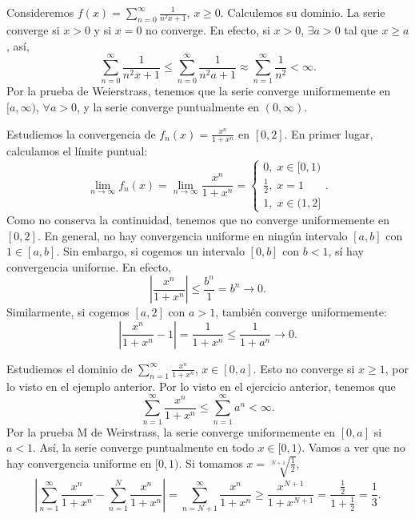 \begin{eg}
\normalfont Consideremos $\displaystyle f\left(x\right) = \sum^{\infty}_{n = 0}\frac{1}{n^{2}x + 1} $, $\displaystyle x \geq 0 $. Calculemos su dominio. 
La serie converge si $\displaystyle x > 0 $ y si $\displaystyle x = 0 $ no converge. En efecto, si $\displaystyle x > 0 $, $\displaystyle \exists a > 0 $ tal que $\displaystyle x \geq a $, así, 
\[\sum^{\infty}_{n = 0}\frac{1}{n^{2}x + 1} \leq \sum^{\infty}_{n = 0}\frac{1}{n^{2}a + 1} \approx \sum^{\infty}_{n = 1}\frac{1}{n^{2}} < \infty .\]
Por la prueba de Weierstrass, tenemos que la serie converge uniformemente en $\displaystyle [a,\infty) $, $\displaystyle \forall a > 0 $, y la serie converge puntualmente en $\displaystyle (0,\infty) $. 
\end{eg}
\begin{eg}
	\normalfont Estudiemos la convergencia de $\displaystyle f_{n}\left(x\right) = \frac{x^{n}}{1 + x^{n}} $ en $\displaystyle \left[0,2\right]  $. En primer lugar, calculamos el límite puntual:
	\[ \lim_{n \to \infty}f_{n}\left(x\right) = \lim_{n \to \infty}\frac{x^{n}}{1+x^{n}} =
	\begin{cases}
	0, \; x \in [0,1) \\
	\frac{1}{2}, \; x = 1 \\
	1, \; x \in (1,2]
	\end{cases}
	.\]
	Como no conserva la continuidad, tenemos que no converge uniformemente en $\displaystyle \left[0,2\right]  $. En general, no hay convergencia uniforme en ningún intervalo $\displaystyle \left[a,b\right]  $ con $\displaystyle 1 \in \left[a,b\right]  $. Sin embargo, si cogemos un intervalo $\displaystyle \left[0,b\right]  $ con $\displaystyle b < 1 $, sí hay convergencia uniforme. En efecto, 
	\[ \left|\frac{x^{n}}{1 + x^{n}}\right| \leq \frac{b^{n}}{1} = b^{n} \to 0 .\]
	Similarmente, si cogemos $\displaystyle [a,2] $ con $\displaystyle a > 1 $, también converge uniformemente:
	\[ \left|\frac{x^{n}}{1+x^{n}}-1\right| = \frac{1}{1+x^{n}} \leq \frac{1}{1+a^{n}} \to 0 .\]
\end{eg}
\begin{eg}
	\normalfont Estudiemos el dominio de $\displaystyle \sum^{\infty}_{n = 1}\frac{x^{n}}{1+x^{n}} $, $\displaystyle x \in \left[0,a\right]  $. Esto no converge si $\displaystyle x \geq 1 $, por lo visto en el ejemplo anterior. Por lo visto en el ejercicio anterior, tenemos que 
	\[\sum^{\infty}_{n = 1}\frac{x^{n}}{1+x^{n}} \leq \sum^{\infty}_{n = 1}a^{n} < \infty .\]
	Por la prueba M de Weirstrass, la serie converge uniformemente en $\displaystyle [0,a] $ si $\displaystyle a < 1 $. Así, la serie converge puntualmente en todo $\displaystyle x \in [0,1) $. Vamos a ver que no hay convergencia uniforme en $\displaystyle [0,1) $. Si tomamos $\displaystyle x= \sqrt[N+1]{\frac{1}{2}} $,
	\[ \left|\sum^{\infty}_{n = 1}\frac{x^{n}}{1+x^{n}}-\sum^{N}_{n = 1}\frac{x^{n}}{1+x^{n}}\right| = \sum^{\infty}_{n = N + 1}\frac{x^{n}}{1+x^{n}} \geq \frac{x^{N+1}}{1+x^{N+1}} = \frac{\frac{1}{2}}{1 + \frac{1}{2}} = \frac{1}{3}.\]
\end{eg}
